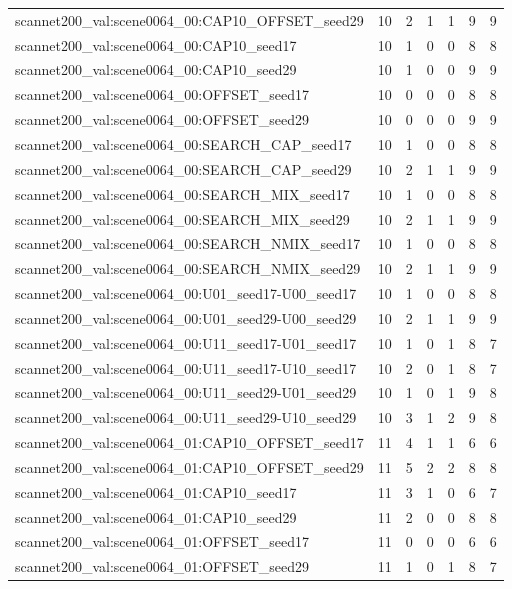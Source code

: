 \begin{table}[t]
\begin{tabular}{lrrrrrr}
scannet200\_val:scene0064\_00:CAP10\_OFFSET\_seed29 & 10 & 2 & 1 & 1 & 9 & 9 \\
scannet200\_val:scene0064\_00:CAP10\_seed17 & 10 & 1 & 0 & 0 & 8 & 8 \\
scannet200\_val:scene0064\_00:CAP10\_seed29 & 10 & 1 & 0 & 0 & 9 & 9 \\
scannet200\_val:scene0064\_00:OFFSET\_seed17 & 10 & 0 & 0 & 0 & 8 & 8 \\
scannet200\_val:scene0064\_00:OFFSET\_seed29 & 10 & 0 & 0 & 0 & 9 & 9 \\
scannet200\_val:scene0064\_00:SEARCH\_CAP\_seed17 & 10 & 1 & 0 & 0 & 8 & 8 \\
scannet200\_val:scene0064\_00:SEARCH\_CAP\_seed29 & 10 & 2 & 1 & 1 & 9 & 9 \\
scannet200\_val:scene0064\_00:SEARCH\_MIX\_seed17 & 10 & 1 & 0 & 0 & 8 & 8 \\
scannet200\_val:scene0064\_00:SEARCH\_MIX\_seed29 & 10 & 2 & 1 & 1 & 9 & 9 \\
scannet200\_val:scene0064\_00:SEARCH\_NMIX\_seed17 & 10 & 1 & 0 & 0 & 8 & 8 \\
scannet200\_val:scene0064\_00:SEARCH\_NMIX\_seed29 & 10 & 2 & 1 & 1 & 9 & 9 \\
scannet200\_val:scene0064\_00:U01\_seed17-U00\_seed17 & 10 & 1 & 0 & 0 & 8 & 8 \\
scannet200\_val:scene0064\_00:U01\_seed29-U00\_seed29 & 10 & 2 & 1 & 1 & 9 & 9 \\
scannet200\_val:scene0064\_00:U11\_seed17-U01\_seed17 & 10 & 1 & 0 & 1 & 8 & 7 \\
scannet200\_val:scene0064\_00:U11\_seed17-U10\_seed17 & 10 & 2 & 0 & 1 & 8 & 7 \\
scannet200\_val:scene0064\_00:U11\_seed29-U01\_seed29 & 10 & 1 & 0 & 1 & 9 & 8 \\
scannet200\_val:scene0064\_00:U11\_seed29-U10\_seed29 & 10 & 3 & 1 & 2 & 9 & 8 \\
scannet200\_val:scene0064\_01:CAP10\_OFFSET\_seed17 & 11 & 4 & 1 & 1 & 6 & 6 \\
scannet200\_val:scene0064\_01:CAP10\_OFFSET\_seed29 & 11 & 5 & 2 & 2 & 8 & 8 \\
scannet200\_val:scene0064\_01:CAP10\_seed17 & 11 & 3 & 1 & 0 & 6 & 7 \\
scannet200\_val:scene0064\_01:CAP10\_seed29 & 11 & 2 & 0 & 0 & 8 & 8 \\
scannet200\_val:scene0064\_01:OFFSET\_seed17 & 11 & 0 & 0 & 0 & 6 & 6 \\
scannet200\_val:scene0064\_01:OFFSET\_seed29 & 11 & 1 & 0 & 1 & 8 & 7 \\

\end{tabular}
\end{table}
